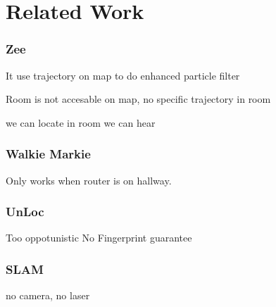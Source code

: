 \section{Related Work}
\label{sec:related}



\subsubsection{Zee}
It use trajectory on map to do enhanced particle filter


Room is not accesable on map, no specific trajectory in room


we can locate in room
we can hear



\subsubsection{Walkie Markie}
Only works when router is on hallway.



\subsubsection{UnLoc}
Too oppotunistic
No Fingerprint guarantee



\subsubsection{SLAM}

no camera, no laser












